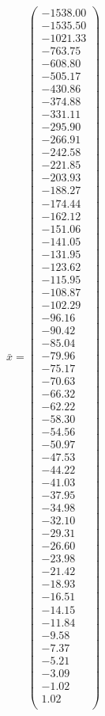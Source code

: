 \documentclass[a4paper,12pt]{article}
\begin{document}
$\bar { x } = \begin{pmatrix}
-1538.00 \\
-1535.50 \\
-1021.33 \\
-763.75 \\
-608.80 \\
-505.17 \\
-430.86 \\
-374.88 \\
-331.11 \\
-295.90 \\
-266.91 \\
-242.58 \\
-221.85 \\
-203.93 \\
-188.27 \\
-174.44 \\
-162.12 \\
-151.06 \\
-141.05 \\
-131.95 \\
-123.62 \\
-115.95 \\
-108.87 \\
-102.29 \\
-96.16 \\
-90.42 \\
-85.04 \\
-79.96 \\
-75.17 \\
-70.63 \\
-66.32 \\
-62.22 \\
-58.30 \\
-54.56 \\
-50.97 \\
-47.53 \\
-44.22 \\
-41.03 \\
-37.95 \\
-34.98 \\
-32.10 \\
-29.31 \\
-26.60 \\
-23.98 \\
-21.42 \\
-18.93 \\
-16.51 \\
-14.15 \\
-11.84 \\
-9.58 \\
-7.37 \\
-5.21 \\
-3.09 \\
-1.02 \\
1.02 \\
\end{pmatrix}
$
\end{document}
